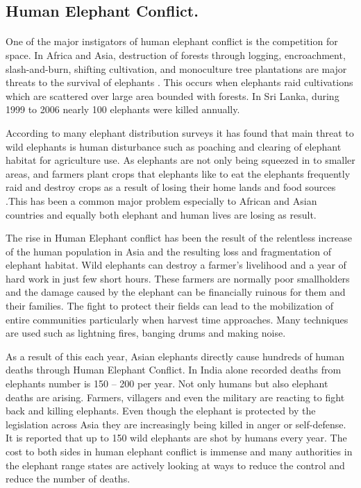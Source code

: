 \documentclass[12pt]{article}
\numberwithin{figure}{section}
\numberwithin{table}{section}
\begin{document}
\subsection{Human Elephant Conflict.}
\paragraph{}
One of the major instigators of human elephant conflict is the competition for space. In Africa and Asia, destruction of forests through logging, encroachment, slash-and-burn, shifting cultivation, and monoculture tree plantations are major threats to the survival of elephants \cite{28}. This occurs when elephants raid cultivations which are scattered over large area bounded with forests. In Sri Lanka, during 1999 to 2006 nearly 100 elephants were killed annually. 

According to many elephant distribution surveys it has found that main threat to wild elephants is human disturbance such as poaching and clearing of elephant habitat for agriculture use. As elephants are not only being squeezed in to smaller areas, and farmers plant crops that elephants like to eat the elephants frequently raid and destroy crops as a result of losing their home lands and food sources .This has been a common major problem especially to African and Asian countries and equally both elephant and human lives are losing as result. \cite{28.5}

The rise in Human Elephant conflict has been the result of the relentless increase of the human population in Asia and the resulting loss and fragmentation of elephant habitat. Wild elephants can destroy a farmer’s livelihood and a year of hard work in just few short hours. These farmers are normally poor smallholders and the damage caused by the elephant can be financially ruinous for them and their families. The fight to protect their fields can lead to the mobilization of entire communities particularly when harvest time approaches. Many techniques are used such as lightning fires, banging drums and making noise. \cite {28.5}

As a result of this each year, Asian elephants directly cause hundreds of human deaths through Human Elephant Conflict. In India alone recorded deaths from elephants number is 150 – 200 per year. Not only humans but also elephant deaths are arising. Farmers, villagers and even the military are reacting to fight back and killing elephants. Even though the elephant is protected by the legislation across Asia they are increasingly being killed in anger or self-defense. It is reported that up to 150 wild elephants are shot by humans every year. The cost to both sides in human elephant conflict is immense and many authorities in the elephant range states are actively looking at ways to reduce the control and reduce the number of deaths. \cite{28.5}
\end{document}
